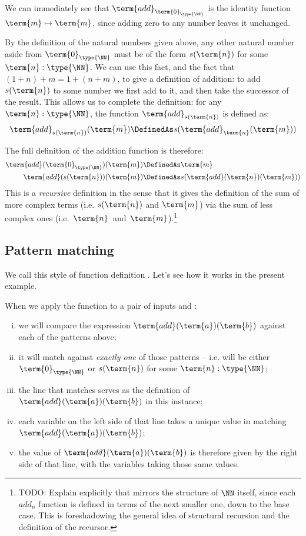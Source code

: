 We can immediately see that $\term{add}_{ \term{0}_{\type{\NN}}}$ is the identity function 
$ \term{m} \mapsto \term{m}$, since adding zero to any number leaves it unchanged.  

By the definition of the natural numbers given above, any other natural number aside from $\term{0}_{\type{\NN}}$
must be of the form $s(\term{n})$ for some 
$\term{n}:\type{\NN}$.  We can use this fact, and the fact that 
$(1+n) + m = 1 + (n + m)$, to 
give a  definition of addition: to add $s(\term{n})$ to some number  we first add  to it, and then take the successor of the result.  This allows us to complete the definition:
for any $\term{n}:\type{\NN}$, 
the function $\term{add}_{s(\term{n})}$ is defined as:
\[
\term{add}_{s(\term{n})}(\term{m}) \DefinedAs
s(\term{add}_{\term{n}}(\term{m}))
\]

  The full definition of the addition function is therefore:
\begin{align*}
\term{add}(\term{0}_{\type{\NN}})(\term{m}) &\DefinedAs \term{m}
\\
\term{add}(s(\term{n}))(\term{m}) &\DefinedAs
s(\term{add}(\term{n})(\term{m}))
\end{align*}
This is a \emph{recursive} definition in the sense that it gives the definition of the sum of more complex terms 
(i.e. $s(\term{n})$ and $\term{m}$)
via the sum of less complex ones
(i.e.~$\term{n}$~and~$\term{m}$).\footnote{
TODO: Explain explicitly that  mirrors the structure of $\NN$ itself, since each $add_n$ function is defined in terms of the next smaller one, down to the base case.  This is foreshadowing the general idea of structural recursion and the definition of the recursor.
}



\subsection{Pattern matching}
\label{sec:NaturalNumbers-PatternMatching}

We call this style of function definition .  Let's see how it works in the present example.

When we apply the  function to a pair of inputs  and :
\begin{enumerate}[(i)]
\item we will compare the expression 
$\term{add}(\term{a})(\term{b})$ against each of the patterns above; 
\item it will match against \emph{exactly one} of those patterns -- i.e.  will be either $\term{0}_{\type{\NN}}$ or $s(\term{n})$ for some $\term{n}:\type{\NN}$;
\item the line that matches serves as the definition of $\term{add}(\term{a})(\term{b})$ in this instance;
\item each variable on the left side of that line takes a unique value in matching $\term{add}(\term{a})(\term{b})$;
\item the value of $\term{add}(\term{a})(\term{b})$ is therefore given by the right side of that line, with the variables taking those same values.
\end{enumerate}


